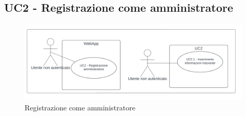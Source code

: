 \subsection{UC2 - Registrazione come amministratore}\label{usecase:2}

\begin{figure}[H]
    \centering
    \includegraphics[width=0.9\linewidth]{ucd/UCD2_corretto.png}
\caption{Registrazione come amministratore}
\end{figure}

